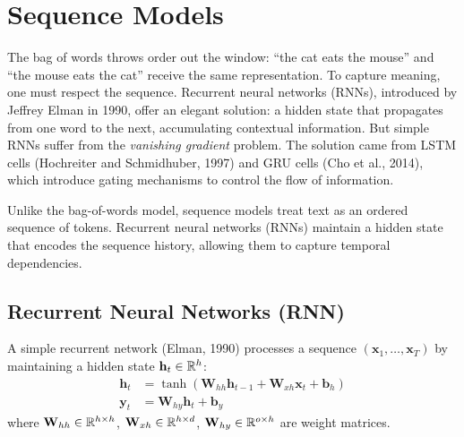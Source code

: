 \chapter{Sequence Models}
\label{ch:sequences}

The bag of words throws order out the window: ``the cat eats the mouse'' and ``the mouse eats the cat'' receive the same representation. To capture meaning, one must respect the sequence. Recurrent neural networks (RNNs), introduced by Jeffrey Elman in 1990, offer an elegant solution: a hidden state that propagates from one word to the next, accumulating contextual information. But simple RNNs suffer from the \emph{vanishing gradient} problem. The solution came from LSTM cells (Hochreiter and Schmidhuber, 1997) and GRU cells (Cho et al., 2014), which introduce gating mechanisms to control the flow of information.

\begin{intuition}[title=\textbf{Modeling word order}]
Unlike the bag-of-words model, sequence models treat text as an ordered
sequence of tokens. Recurrent neural networks (RNNs) maintain a hidden state
that encodes the sequence history, allowing them to capture temporal
dependencies.
\end{intuition}

\section{Recurrent Neural Networks (RNN)}
\label{sec:seq:rnn}

\begin{definition}
A simple recurrent network (Elman, 1990) processes a sequence
$(\mathbf{x}_1, \ldots, \mathbf{x}_T)$ by maintaining a hidden state
$\mathbf{h}_t \in \mathbb{R}^h$:
\begin{align}
\mathbf{h}_t &= \tanh(\mathbf{W}_{hh} \mathbf{h}_{t-1} + \mathbf{W}_{xh} \mathbf{x}_t + \mathbf{b}_h) \\
\mathbf{y}_t &= \mathbf{W}_{hy} \mathbf{h}_t + \mathbf{b}_y
\end{align}
where $\mathbf{W}_{hh} \in \mathbb{R}^{h \times h}$, $\mathbf{W}_{xh} \in \mathbb{R}^{h \times d}$,
$\mathbf{W}_{hy} \in \mathbb{R}^{o \times h}$ are weight matrices.
\end{definition}

